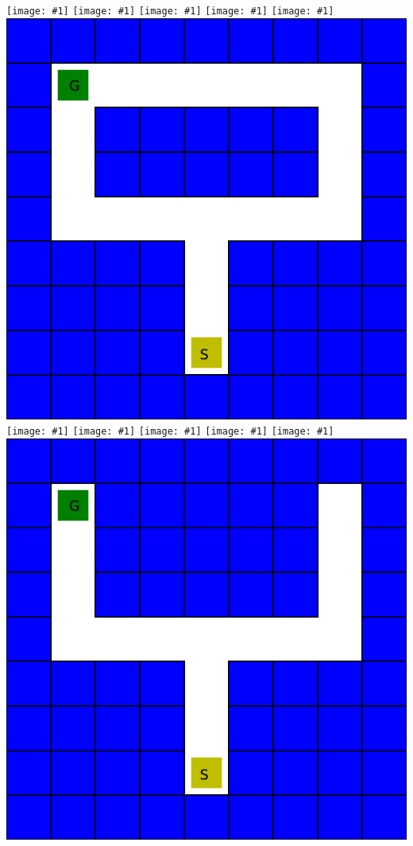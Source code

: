 \def\figw{0.16\columnwidth}%
\newcommand{\includesnapshot}[1]{%
  \texttt{[image: \#1]}}%
\includesnapshot{images/snapshot/00063000-snapshot.png}%
\includesnapshot{images/snapshot/00087000-snapshot.png}%
\includesnapshot{images/snapshot/00156165-snapshot.png}%
\includesnapshot{images/snapshot/00159840-snapshot.png}%
\includesnapshot{images/snapshot/00166605-snapshot.png}%
\includegraphics[width=\figw]{images/dhiman_0002_entityLayer.pdf}\\
\includesnapshot{images/snapshot/00193065-snapshot.png}%
\includesnapshot{images/snapshot/00338220-snapshot.png}%
\includesnapshot{images/snapshot/00344985-snapshot.png}%
\includesnapshot{images/snapshot/00948930-snapshot.png}%
\includesnapshot{images/snapshot/00956325-snapshot.png}%
\includegraphics[width=\figw]{images/dhiman_0003_entityLayer.pdf}\\
